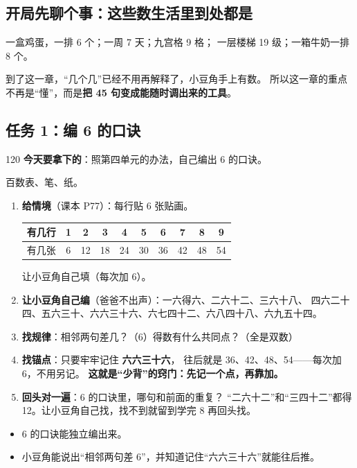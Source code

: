 \subsection{开局先聊个事：这些数生活里到处都是}

一盒鸡蛋，一排 6 个；一周 7 天；九宫格 9 格；
一层楼梯 19 级；一箱牛奶一排 8 个。

到了这一章，“几个几”已经不用再解释了，小豆角手上有数。
所以这一章的重点不再是“懂”，而是\textbf{把 45 句变成能随时调出来的工具}。

\subsection{任务 1：编 6 的口诀}

\begin{lesson}{1}{20}
\textbf{今天要拿下的}：照第四单元的办法，自己编出 6 的口诀。

\begin{materials}
百数表、笔、纸。
\end{materials}

\begin{enumerate}
  \item \textbf{给情境}（课本 P77）：每行贴 6 张贴画。
        \begin{center}
        \small
        \begin{tabular}{@{}l*{9}{c}@{}}
        \toprule
        有几行 & 1 & 2 & 3 & 4 & 5 & 6 & 7 & 8 & 9 \\
        \midrule
        有几张 & 6 & 12 & 18 & 24 & 30 & 36 & 42 & 48 & 54 \\
        \bottomrule
        \end{tabular}
        \end{center}
        让小豆角自己填（每次加 6）。
  \item \textbf{让小豆角自己编}（爸爸不出声）：一六得六、二六十二、三六十八、
        四六二十四、五六三十、六六三十六、六七四十二、六八四十八、六九五十四。
  \item \textbf{找规律}：相邻两句差几？（6）得数有什么共同点？（全是双数）
  \item \textbf{找锚点}：只要牢牢记住 \textbf{六六三十六}，
        往后就是 36、42、48、54——每次加 6，不用另记。
        \textbf{这就是“少背”的窍门：先记一个点，再靠加。}
  \item \textbf{回头对一遍}：6 的口诀里，哪句和前面的重复？
        “二六十二”和“三四十二”都得 12。让小豆角自己找，找不到就留到学完 8 再回头找。
\end{enumerate}

\begin{passbox}
\begin{itemize}
  \item 6 的口诀能独立编出来。
  \item 小豆角能说出“相邻两句差 6”，并知道记住“六六三十六”就能往后推。
\end{itemize}
\end{passbox}
\end{lesson}

